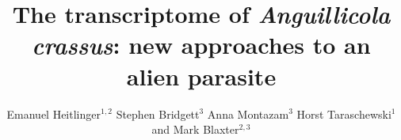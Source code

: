 \documentclass[10pt]{bmc_article}
\newenvironment{bmcformat}{\begin{raggedright}\baselineskip20pt\sloppy\setboolean{publ}{false}}{\end{raggedright}\baselineskip20pt\sloppy}
\begin{document}
\begin{bmcformat}



  \title{The transcriptome of \textit{Anguillicola crassus}: new
    approaches to an alien parasite}
 


\author{Emanuel Heitlinger\correspondingauthor$^{1,2}$%
       Stephen Bridgett$^{3}$%
       Anna Montazam$^{3}$%
       Horst Taraschewski$^1$%
       and Mark Blaxter$^{2,3}$%
     }%
      


      \address{%
        \iid(1)Department of Ecology and Parasitology, Zoological
        Institute 1, University of Karlsruhe,%
        Kornblumenstrasse 13, Karlsruhe, Germany\\
        \iid(2)Institute of Evolutionary Biology, The Ashworth laboratories, The University of Edinburgh, King's Buildings Campus, Edinburgh EH9 3JT, UK
        \iid(3)The GenePool Sequencing Service, The Ashworth laboratories, The University of Edinburgh, King's Buildings Campus, Edinburgh EH9 3JT, UK
      }%

\maketitle


\end{bmcformat}
\end{document}
